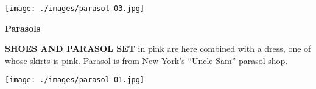 \begin{minipage}{\textwidth}
\begin{minipage}[b][\textheight][b]{.47\linewidth}
\vspace*{2cm}

\texttt{[image: ./images/parasol-03.jpg]}\par
\vspace{2\baselineskip}

\centerline{\bfseries\Huge Parasols}
\vspace{2\baselineskip}

\begin{quote}
\lipsum[2]
\end{quote}

\vfill

\textbf{SHOES AND PARASOL SET} in pink are here combined with a dress, one of whose skirts is pink. Parasol is from New York's ``Uncle Sam'' parasol shop.
\end{minipage}\hspace*{1cm}
\begin{minipage}[b]{.53\linewidth}
\mbox{}
\texttt{[image: ./images/parasol-01.jpg]}\par
\end{minipage}
\end{minipage}


\clearpage
